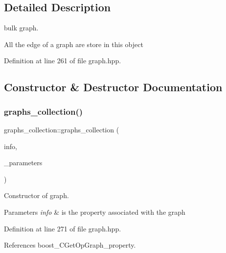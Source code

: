 \subsection{Detailed Description}
bulk graph. 

All the edge of a graph are store in this object 

Definition at line 261 of file graph.\+hpp.



\subsection{Constructor \& Destructor Documentation}
\mbox{\label{structgraphs__collection_a7fe206e9809e6e2abc61574f41886a75}} 
\subsubsection{\texorpdfstring{graphs\+\_\+collection()}{graphs\_collection()}}
{\footnotesize\ttfamily graphs\+\_\+collection\+::graphs\+\_\+collection (\begin{DoxyParamCaption}\item[{\hyperlink{graph__info_8hpp_a4a5c364c379e5139b7dc97e7e69c7da3}{Graph\+Info\+Ref}}]{info,  }\item[{const \hyperlink{Parameter_8hpp_a37841774a6fcb479b597fdf8955eb4ea}{Parameter\+Const\+Ref}}]{\+\_\+parameters }\end{DoxyParamCaption})\hspace{0.3cm}{\ttfamily [inline]}}



Constructor of graph. 


\begin{DoxyParams}{Parameters}
{\em info} & is the property associated with the graph \\
\hline
\end{DoxyParams}


Definition at line 271 of file graph.\+hpp.



References boost\+\_\+\+C\+Get\+Op\+Graph\+\_\+property.

\mbox{\label{structgraphs__collection_ae317ca538bc5904eded24c0e6b6d2587}} 
